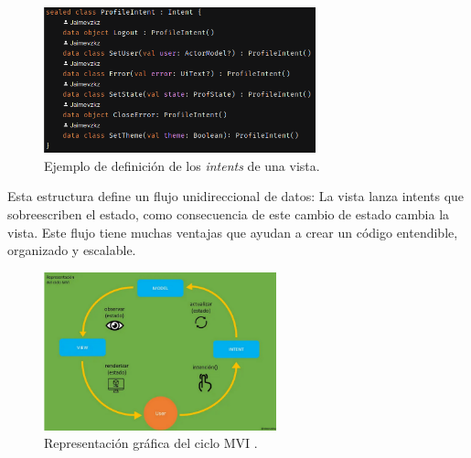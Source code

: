 \begin{itemize}
    \begin{figure}[h]
        \centering
        \includegraphics[width = 0.7\textwidth]{Imagenes/Fuentes/ejemplo_intent.png}
        \caption{Ejemplo de definición de los \textit{intents} de una vista.}
        \label{fig:ejemplo_intent}
    \end{figure}
\end{itemize}
Esta estructura define un flujo unidireccional de datos: La vista lanza intents que sobreescriben el estado, como consecuencia de este cambio de estado cambia la vista. Este flujo tiene muchas ventajas que ayudan a crear un código entendible, organizado y escalable.
\begin{figure}[h]
    \centering
    \includegraphics[width = 0.6\textwidth]{Imagenes/Fuentes/visual_mvi.png}
    \caption{Representación gráfica del ciclo MVI \citep{mviExplanation}.}
    \label{fig:visualMvi}
\end{figure}

